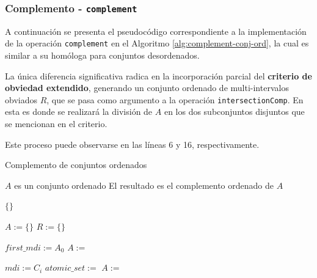 \subsubsection{Complemento - \texttt{complement}}

A continuación se presenta el pseudocódigo correspondiente a la implementación de la operación \texttt{complement} en el Algoritmo \ref{alg:complement-conj-ord}, la cual es similar a su homóloga para conjuntos desordenados. 

La única diferencia significativa radica en la incorporación parcial del \textbf{criterio de obviedad extendido}, generando un conjunto ordenado de multi-intervalos obviados $R$, que se pasa como argumento a la operación \texttt{intersectionComp}. En esta es donde se realizará la división de $A$ en los dos subconjuntos disjuntos que se mencionan en el criterio. 

Este proceso puede observarse en las líneas 6 y 16, respectivamente.


\begin{algorithm}
\caption{Complemento de conjuntos ordenados}\label{alg:complement-conj-ord}
\begin{algorithmic}[1]
\Require $A$ es un conjunto ordenado
\Ensure El resultado es el complemento ordenado de $A$

    \State \Return $ \{\}$
\EndIf

\State $A :=  \{\}$
\State $R :=  \{\}$

\State $first\_mdi := A_0$
\State $A :=$ 

    \State $mdi := C_i$
    \State $atomic\_set :=$ 
    \State $A :=$ 
\EndFor

\State \Return {}
\EndFunction
\end{algorithmic}
\end{algorithm}


